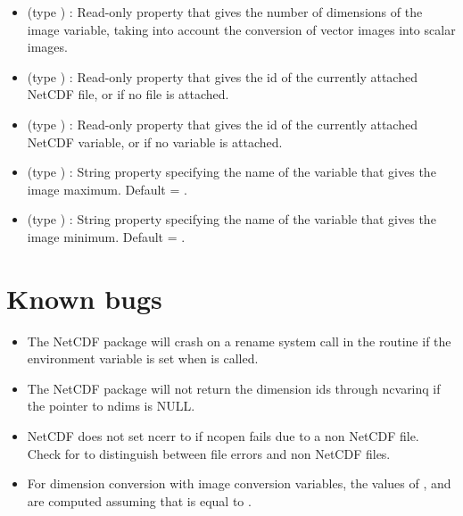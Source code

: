\begin{itemize}
\item {} (type ) : Read-only property
that gives the number of dimensions of the image variable, taking into
account the conversion of vector images into scalar images.

\item {} (type ) : Read-only property
that gives the id of the currently attached NetCDF file, or
 if no file is attached.

\item {} (type ) : Read-only property
that gives the id of the currently attached NetCDF variable, or
 if no variable is attached.

\item {} (type ) : String property
specifying the name of the variable that gives the image maximum. 
Default = . 

\item {} (type ) : String property
specifying the name of the variable that gives the image minimum. 
Default = .

\end{itemize}

\section{Known bugs}

\begin{itemize}

\item The NetCDF package will crash on a rename system call in the
routine  if the environment variable  is set
when  is called.

\item The NetCDF package will not return the dimension ids through
ncvarinq if the pointer to ndims is NULL.

\item NetCDF does not set ncerr to  if ncopen fails
due to a non NetCDF file. Check for  to distinguish
between file errors and non NetCDF files.

\item For dimension conversion with image conversion variables, the
values of ,  and
 are computed assuming that
 is equal to . 

\end{itemize}



